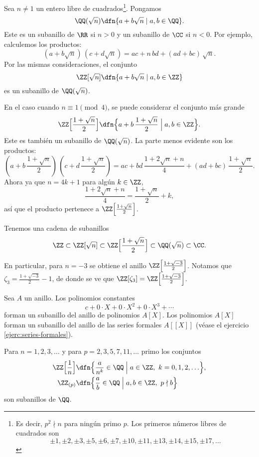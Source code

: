 \begin{ejemplo}
  Sea $n \ne 1$ un entero libre de cuadrados\footnote{Es decir, $p^2 \nmid n$
    para ningún primo $p$. Los primeros números libres de cuadrados son
    $$\pm 1, \pm 2, \pm 3, \pm 5, \pm 6, \pm 7, \pm 10, \pm 11, \pm 13, \pm 14, \pm 15, \pm 17, \ldots$$}. Pongamos
  $$\QQ (\sqrt{n}) \dfn \{ a + b\sqrt{n} \mid a,b\in \QQ \}.$$
  Este es un subanillo de $\RR$ si $n > 0$ y un subanillo de $\CC$ si
  $n < 0$. Por ejemplo, calculemos los productos:
  $$(a+b\sqrt{n}) \, (c+d\sqrt{n}) = ac + n\,bd + (ad+bc)\,\sqrt{n}.$$
  Por las mismas consideraciones, el conjunto
  $$\ZZ [\sqrt{n}] \dfn \{ a + b\sqrt{n} \mid a,b\in \ZZ \}$$
  es un subanillo de $\QQ (\sqrt{n})$.

  En el caso cuando $n \equiv 1 \pmod{4}$, se puede considerar el conjunto más
  grande
  \[ \ZZ \Bigl[\frac{1+\sqrt{n}}{2}\Bigr] \dfn
    \Bigl\{ a + b\,\frac{1+\sqrt{n}}{2} \Bigm| a,b\in \ZZ \Bigr\}. \]
  Este es también un subanillo de $\QQ (\sqrt{n})$. La parte menos evidente son
  los productos:
  \[ \left(a + b\,\frac{1+\sqrt{n}}{2}\right)\,\left(c + d\,\frac{1+\sqrt{n}}{2}\right) =
    ac + bd\,\frac{1 + 2\sqrt{n} + n}{4} + (ad + bc)\,\frac{1+\sqrt{n}}{2}. \]
  Ahora ya que $n = 4k + 1$ para algún $k \in \ZZ$,
  $$\frac{1 + 2\sqrt{n} + n}{4} = \frac{1 + \sqrt{n}}{2} + k,$$
  así que el producto pertenece a $\ZZ \Bigl[\frac{1+\sqrt{n}}{2}\Bigr]$. 

  Tenemos una cadena de subanillos
  \[ \ZZ \subset \ZZ [\sqrt{n}] \subset
    \ZZ \Bigl[\frac{1+\sqrt{n}}{2}\Bigr] \subset
    \QQ (\sqrt{n}) \subset \CC. \]

  En particular, para $n = -3$ se obtiene el anillo
  $\ZZ \Bigl[\frac{1+\sqrt{-3}}{2}\Bigr]$. Notamos que
  $\zeta_3 = \frac{1+\sqrt{-3}}{2} - 1$, de donde se ve que
  $\ZZ [\zeta_3] = \ZZ \Bigl[\frac{1+\sqrt{-3}}{2}\Bigr]$.
\end{ejemplo}

\begin{ejemplo}
  Sea $A$ un anillo. Los polinomios constantes
  $$c + 0\cdot X + 0\cdot X^2 + 0\cdot X^3 + \cdots$$
  forman un subanillo del anillo de polinomios $A [X]$. Los polinomios $A [X]$
  forman un subanillo del anillo de las series formales $A [\![X]\!]$
  (véase el ejercicio \ref{ejerc:series-formales}).
\end{ejemplo}

\begin{ejemplo}
  Para $n = 1,2,3,\ldots$ y para $p = 2,3,5,7,11,\ldots$ primo los conjuntos
  \begin{align*}
    \ZZ \Bigl[\frac{1}{n}\Bigr] & \dfn \Bigl\{ \frac{a}{n^k} \in \QQ \Bigm| a\in \ZZ, ~ k = 0,1,2,\ldots \Bigr\},\\
    \ZZ_{(p)} & \dfn \Bigl\{ \frac{a}{b} \in \QQ \Bigm| a,b\in \ZZ, ~ p\nmid b \Bigr\}
  \end{align*}
  son subanillos de $\QQ$.
\end{ejemplo}

